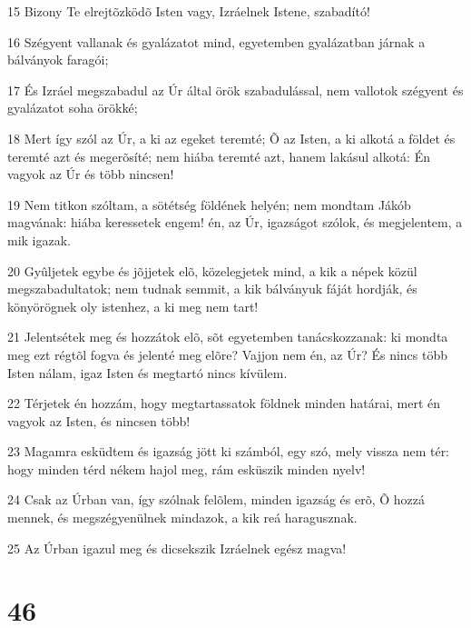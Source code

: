 \par 15 Bizony Te elrejtõzködõ Isten vagy, Izráelnek Istene, szabadító!
\par 16 Szégyent vallanak és gyalázatot mind, egyetemben gyalázatban járnak a bálványok faragói;
\par 17 És Izráel megszabadul az Úr által örök szabadulással, nem vallotok szégyent és gyalázatot soha örökké;
\par 18 Mert így szól az Úr, a ki az egeket teremté; Õ az Isten, a ki alkotá a földet és teremté azt és megerõsíté; nem hiába teremté azt, hanem lakásul alkotá: Én vagyok az Úr és több nincsen!
\par 19 Nem titkon szóltam, a sötétség földének helyén; nem mondtam Jákób magvának: hiába keressetek engem! én, az Úr, igazságot szólok, és megjelentem, a mik igazak.
\par 20 Gyûljetek egybe és jõjjetek elõ, közelegjetek mind, a kik a népek közül megszabadultatok; nem tudnak semmit, a kik bálványuk fáját hordják, és könyörögnek oly istenhez, a ki meg nem tart!
\par 21 Jelentsétek meg és hozzátok elõ, sõt egyetemben tanácskozzanak: ki mondta meg ezt régtõl fogva és jelenté meg elõre? Vajjon nem én, az Úr? És nincs több Isten nálam, igaz Isten és megtartó nincs kívülem.
\par 22 Térjetek én hozzám, hogy megtartassatok földnek minden határai, mert én vagyok az Isten, és nincsen több!
\par 23 Magamra esküdtem és igazság jött ki számból, egy szó, mely vissza nem tér: hogy minden térd nékem hajol meg, rám esküszik minden nyelv!
\par 24 Csak az Úrban van, így szólnak felõlem, minden igazság és erõ, Õ hozzá mennek, és megszégyenülnek mindazok, a kik reá haragusznak.
\par 25 Az Úrban igazul meg és dicsekszik Izráelnek egész magva!

\chapter{46}

